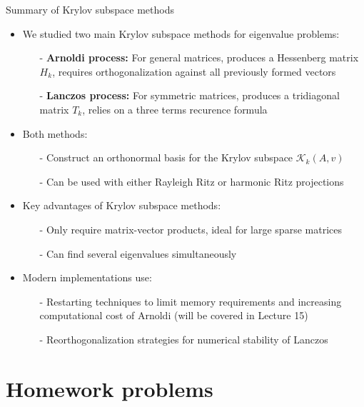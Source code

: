 \documentclass[t,usepdftitle=false]{beamer}
\begin{document}
\begin{frame}{Summary of Krylov subspace methods}
\begin{itemize}
\item We studied two main Krylov subspace methods for eigenvalue problems:
\begin{itemize}\normalsize
\item[-] \textbf{Arnoldi process:} For general matrices, produces a Hessenberg matrix $H_k$, requires orthogonalization against all previously formed vectors
\item[-] \textbf{Lanczos process:} For symmetric matrices, produces a tridiagonal matrix $T_k$, relies on a three terms recurence formula
\end{itemize}
\item Both methods:
\begin{itemize}\normalsize
\item[-] Construct an orthonormal basis for the Krylov subspace $\mathcal{K}_k(A,v)$
\item[-] Can be used with either Rayleigh Ritz or harmonic Ritz projections
\end{itemize}
\item Key advantages of Krylov subspace methods:
\begin{itemize}\normalsize
\item[-] Only require matrix-vector products, ideal for large sparse matrices
\item[-] Can find several eigenvalues simultaneously
\end{itemize}
\item Modern implementations use:
\begin{itemize}\normalsize
\item[-] Restarting techniques to limit memory requirements and increasing computational cost of Arnoldi (will be covered in Lecture 15)
\item[-] Reorthogonalization strategies for numerical stability of Lanczos
\end{itemize}
\end{itemize}
\end{frame}
		
\section{Homework problems}
\end{document}
